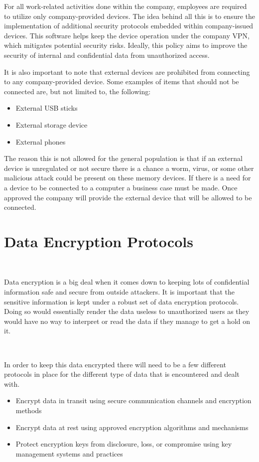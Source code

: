 \documentclass[12pt,a4paper]{report}
\begin{document}
For all work-related activities done within the company, employees are required to utilize only company-provided devices.
The idea behind all this is to ensure the implementation of additional security protocols embedded within company-issued devices.
This software helps keep the device operation under the company VPN, which mitigates potential security risks.
Ideally, this policy aims to improve the security of internal and confidential data from unauthorized access.

\pagebreak %

It is also important to note that external devices are prohibited from connecting to any company-provided device.
Some examples of items that should not be connected are, but not limited to, the following:
\begin{itemize}
 \item External USB sticks
 \item External storage device
 \item External phones
\end{itemize}

The reason this is not allowed for the general population is that if an external device is unregulated or not secure there is a chance a worm, virus, or some other malicious attack could be present on these memory devices.
If there is a need for a device to be connected to a computer a business case must be made.
Once approved the company will provide the external device that will be allowed to be connected.

\section{Data Encryption Protocols}
\

Data encryption is a big deal when it comes down to keeping lots of confidential information safe and secure from outside attackers.
It is important that the sensitive information is kept under a robust set of data encryption protocols.
Doing so would essentially render the data useless to unauthorized users as they would have no way to interpret or read the data if they manage to get a hold on it.

\

In order to keep this data encrypted there will need to be a few different protocols in place for the different type of data that is encountered and dealt with.
\begin{itemize}
 \item Encrypt data in transit using secure communication channels and encryption methods
 \item Encrypt data at rest using approved encryption algorithms and mechanisms
 \item Protect encryption keys from disclosure, loss, or compromise using key management systems and practices
\end{itemize}
\end{document}
